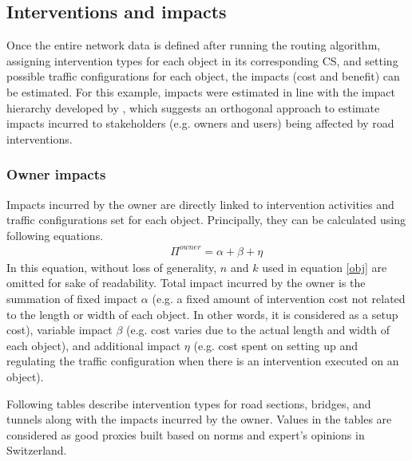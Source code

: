 \documentclass[a4paper,3p,times,authoryear]{elsarticle}
\begin{document}
\subsection{Interventions and impacts}
Once the entire network data is defined after running the routing algorithm, assigning intervention types for each object in its corresponding CS, and setting possible traffic configurations for each object, the impacts (cost and benefit) can be estimated. For this example, impacts were estimated in line with the impact hierarchy developed by \cite{Adey2012}, which suggests an orthogonal approach to estimate impacts incurred to stakeholders (e.g. owners and users) being affected by road interventions.
% 
\subsubsection{Owner impacts}
Impacts incurred by the owner are directly linked to intervention activities and traffic configurations set for each object. Principally, they can be calculated using following equations.
\begin{eqnarray}
      && \Pi^{owner}=\alpha+\beta+\eta \label{intervention}
\end{eqnarray}
In this equation, without loss of generality, $n$ and $k$ used in equation \eqref{obj} are omitted for sake of readability. Total impact incurred by the owner is the summation of fixed impact $\alpha$ (e.g. a fixed amount of intervention cost not related to the length or width of each object. In other words, it is considered as a setup cost), variable impact $\beta$ (e.g. cost varies due to the actual length and width of each object), and additional impact $\eta$ (e.g. cost spent on setting up and regulating the traffic configuration when there is an intervention executed on an object).

Following tables describe intervention types for road sections, bridges, and tunnels along with the impacts incurred by the owner. Values in the tables are considered as good proxies built based on norms and expert's opinions in Switzerland.
\end{document}
